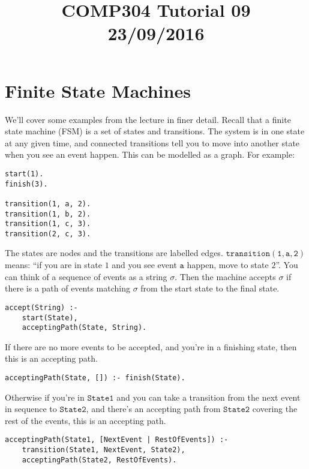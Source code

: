 \documentclass[a4paper,12pt]{article}
\newcommand{\kwa}[1]{\mathtt{#1}}
\begin{document}
\title{COMP304 Tutorial 09 \\ 23/09/2016}
\date{}
\maketitle

\section{Finite State Machines}

We'll cover some examples from the lecture in finer detail. Recall that a finite state machine (FSM) is a set of states and transitions. The system is in one state at any given time, and connected transitions tell you to move into another state when you see an event happen. This can be modelled as a graph. For example:

\begin{lstlisting}
start(1).
finish(3).

transition(1, a, 2).
transition(1, b, 2).
transition(1, c, 3).
transition(2, c, 3).
\end{lstlisting}

\noindent
The states are nodes and the transitions are labelled edges. $\kwa{transition(1, a, 2)}$ means: ``if you are in state $1$ and you see event $\kwa{a}$ happen, move to state $2$''. You can think of a sequence of events as a string $\sigma$. Then the machine accepts $\sigma$ if there is a path of events matching $\sigma$ from the start state to the final state.

\begin{lstlisting}
accept(String) :-
    start(State),
    acceptingPath(State, String).
\end{lstlisting}

\noindent
If there are no more events to be accepted, and you're in a finishing state, then this is an accepting path.

\begin{lstlisting}
acceptingPath(State, []) :- finish(State).
\end{lstlisting}

\noindent
Otherwise if you're in $\kwa{State1}$ and you can take a transition from the next event in sequence to $\kwa{State2}$, and there's an accepting path from $\kwa{State2}$ covering the rest of the events, this is an accepting path.

\begin{lstlisting}
acceptingPath(State1, [NextEvent | RestOfEvents]) :-
    transition(State1, NextEvent, State2),
    acceptingPath(State2, RestOfEvents).
\end{lstlisting}
\end{document}
